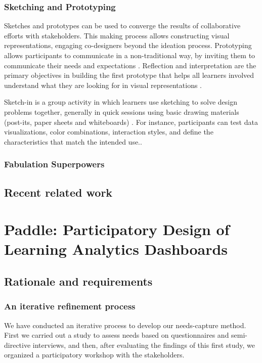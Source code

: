 \documentclass[preprint,12pt]{elsarticle}
\begin{document}
\subsubsection{Sketching and Prototyping}
Sketches and prototypes can be used to converge the results of collaborative efforts with stakeholders. This making process allows constructing visual representations, engaging co-designers beyond the ideation process. Prototyping allows participants to communicate in a non-traditional way, by inviting them to communicate their needs and expectations \cite{gaver1999design}.
Reflection and interpretation are the primary objectives in building the first prototype that helps all learners involved understand what they are looking for in visual representations \cite{luckin2013handbook}.

Sketch-in is a group activity in which learners use sketching to solve design problems together, generally in quick sessions using basic drawing materials (post-its, paper sheets and whiteboards) \cite{prieto2018co}. For instance, participants can test data visualizations, color combinations, interaction styles, and define the characteristics that match the intended use..


\subsubsection{Fabulation Superpowers}


\subsection{Recent related work}


\section{Paddle: Participatory Design of Learning Analytics Dashboards}
\subsection{Rationale and requirements}
\subsubsection{An iterative refinement process}
\label{sec:dimensions}
We have conducted an iterative process to develop our needs-capture method. First we carried out a study to assess needs based on questionnaires and semi-directive interviews, and then, after evaluating  the findings of this first study, we organized a participatory workshop with the stakeholders.
\end{document}
